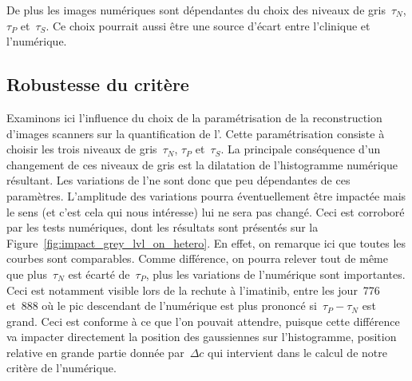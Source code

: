 \documentclass[main.tex]{subfiles}
\begin{document}
De plus les images numériques sont dépendantes du choix des niveaux de gris~$\tau_N$, $\tau_P$ et~$\tau_S$. Ce choix pourrait aussi être une source d'écart entre l'\hetero clinique et l'\hetero numérique.

\subsection{Robustesse du critère}
Examinons ici l'influence du choix de la paramétrisation de la reconstruction d'images scanners sur la quantification de l'\hetero. 
Cette paramétrisation consiste à choisir les trois niveaux de gris~$\tau_N$, $\tau_P$ et~$\tau_S$.  
La principale conséquence d'un changement de ces niveaux de gris est la dilatation de l'histogramme numérique résultant.  
Les variations de l'\hetero ne sont donc que peu dépendantes de ces paramètres. L'amplitude des variations pourra éventuellement être impactée mais le sens (et c'est cela qui nous intéresse) lui ne sera pas changé. 
Ceci est corroboré par les tests numériques, dont les résultats sont présentés sur la Figure~\ref{fig:impact_grey_lvl_on_hetero}. 
En effet, on remarque ici que toutes les courbes sont comparables. Comme différence, on pourra relever tout de même que plus~$\tau_N$ est écarté de~$\tau_P$, plus les variations de l'\hetero numérique sont importantes. Ceci est notamment visible lors de la rechute à l'imatinib, entre les jour~776 et~888 où le pic descendant de l'\hetero numérique est plus prononcé si~$\tau_P-\tau_N$ est grand. Ceci est conforme à ce que l'on pouvait attendre, puisque cette différence va impacter directement la position des gaussiennes sur l'histogramme, position relative en grande partie donnée par~$\Delta c$ qui intervient dans le calcul de notre critère de l'\hetero numérique. 

\end{document}

